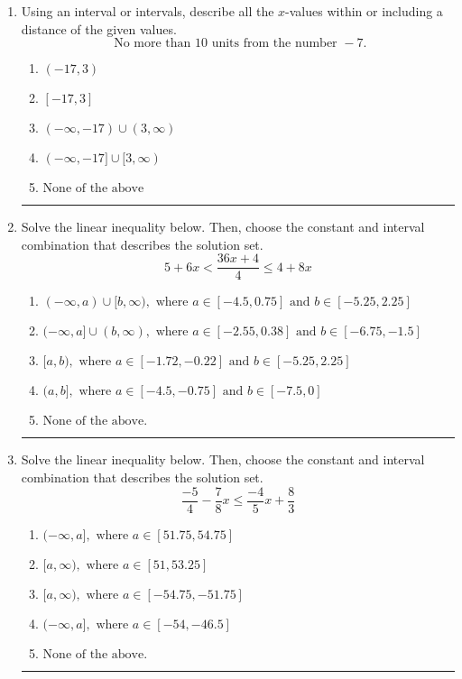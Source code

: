 \documentclass[14pt]{extbook}
\newcommand{\litem}[1]{\item#1\hspace*{-1cm}\rule{\textwidth}{0.4pt}}
\begin{document}
\begin{enumerate}
{\begin{enumerate}[label=\Alph*.]
\end{enumerate} }
\litem{
Using an interval or intervals, describe all the $x$-values within or including a distance of the given values.\[ \text{ No more than } 10 \text{ units from the number } -7. \]\begin{enumerate}[label=\Alph*.]
\item \( (-17, 3) \)
\item \( [-17, 3] \)
\item \( (-\infty, -17) \cup (3, \infty) \)
\item \( (-\infty, -17] \cup [3, \infty) \)
\item \( \text{None of the above} \)

\end{enumerate} }
\litem{
Solve the linear inequality below. Then, choose the constant and interval combination that describes the solution set.\[ 5 + 6 x < \frac{36 x + 4}{4} \leq 4 + 8 x \]\begin{enumerate}[label=\Alph*.]
\item \( (-\infty, a) \cup [b, \infty), \text{ where } a \in [-4.5, 0.75] \text{ and } b \in [-5.25, 2.25] \)
\item \( (-\infty, a] \cup (b, \infty), \text{ where } a \in [-2.55, 0.38] \text{ and } b \in [-6.75, -1.5] \)
\item \( [a, b), \text{ where } a \in [-1.72, -0.22] \text{ and } b \in [-5.25, 2.25] \)
\item \( (a, b], \text{ where } a \in [-4.5, -0.75] \text{ and } b \in [-7.5, 0] \)
\item \( \text{None of the above.} \)

\end{enumerate} }
\litem{
Solve the linear inequality below. Then, choose the constant and interval combination that describes the solution set.\[ \frac{-5}{4} - \frac{7}{8} x \leq \frac{-4}{5} x + \frac{8}{3} \]\begin{enumerate}[label=\Alph*.]
\item \( (-\infty, a], \text{ where } a \in [51.75, 54.75] \)
\item \( [a, \infty), \text{ where } a \in [51, 53.25] \)
\item \( [a, \infty), \text{ where } a \in [-54.75, -51.75] \)
\item \( (-\infty, a], \text{ where } a \in [-54, -46.5] \)
\item \( \text{None of the above}. \)


\end{enumerate}}
\end{enumerate}
\end{document}
